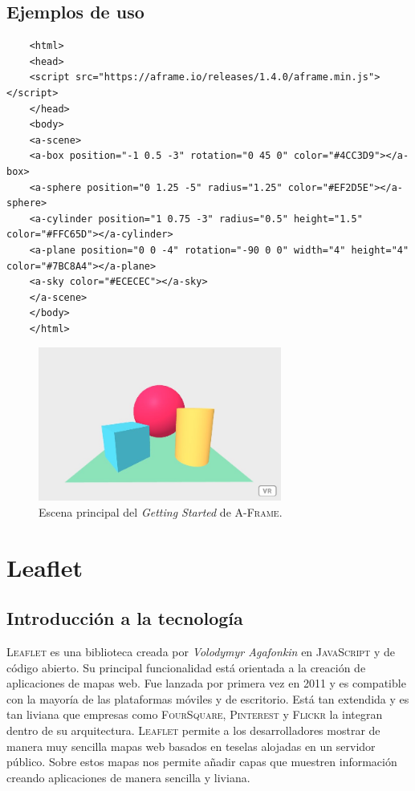\documentclass[a4paper, 11pt]{book}
\begin{document}
\subsection{Ejemplos de uso}
\begin{verbatim}
	<html>
	<head>
	<script src="https://aframe.io/releases/1.4.0/aframe.min.js"></script>
	</head>
	<body>
	<a-scene>
	<a-box position="-1 0.5 -3" rotation="0 45 0" color="#4CC3D9"></a-box>
	<a-sphere position="0 1.25 -5" radius="1.25" color="#EF2D5E"></a-sphere>
	<a-cylinder position="1 0.75 -3" radius="0.5" height="1.5" color="#FFC65D"></a-cylinder>
	<a-plane position="0 0 -4" rotation="-90 0 0" width="4" height="4" color="#7BC8A4"></a-plane>
	<a-sky color="#ECECEC"></a-sky>
	</a-scene>
	</body>
	</html>
\end{verbatim}
\begin{figure}[h]
	\centering
	\includegraphics[width=8cm, keepaspectratio]{img/gettingstarted_Aframe.jpg}
	\caption{Escena principal del \emph{Getting Started} de \textsc{A-Frame}.}
	\label{fig:AFrameGettingStarted}
\end{figure}
\section{Leaflet}
\label{sec:leaflet}
\subsection{Introducción a la tecnología}
\textsc{Leaflet} es una biblioteca creada por \emph{Volodymyr Agafonkin} en \textsc{JavaScript} y de código abierto.
Su principal funcionalidad está orientada a la creación de aplicaciones de mapas web. Fue lanzada por primera vez en 2011 y es compatible con la mayoría de las plataformas móviles y de escritorio.
Está tan extendida y es tan liviana que empresas como \textsc{FourSquare}, \textsc{Pinterest} y \textsc{Flickr} la integran dentro de su arquitectura.
\textsc{Leaflet} permite a los desarrolladores mostrar de manera muy sencilla mapas web basados en teselas alojadas en un servidor público. Sobre estos mapas nos permite añadir capas que muestren información creando aplicaciones de manera sencilla y liviana.
\end{document}
